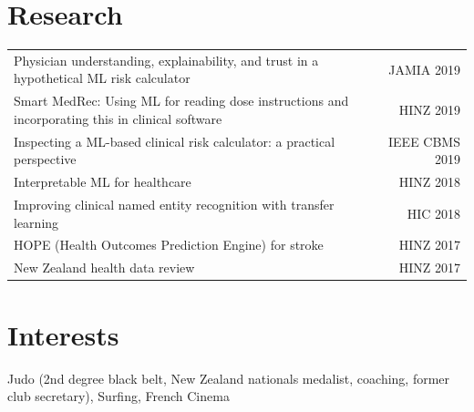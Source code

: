 \documentclass[letterpaper,11pt]{article}
\begin{document}
\section{Research} 
\begin{tabular*}{\textwidth}{l@{\extracolsep{\fill}}r}
Physician understanding, explainability, and trust in a hypothetical ML risk calculator & JAMIA 2019\\
{\small Smart MedRec: Using ML for reading dose instructions and incorporating this in clinical software} & HINZ 2019\\
Inspecting a ML-based clinical risk calculator: a practical perspective & IEEE CBMS 2019\\
Interpretable ML for healthcare & HINZ 2018\\
Improving clinical named entity recognition with transfer learning &  HIC 2018\\
HOPE (Health Outcomes Prediction Engine) for stroke & HINZ 2017\\
New Zealand health data review & HINZ 2017\\
\end{tabular*}



\section{Interests}
Judo (2nd degree black belt, New Zealand nationals medalist, coaching, former club secretary), Surfing, French Cinema
\end{document}
